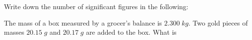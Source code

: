 \documentclass[10pt, a4paper]{exam}
\begin{document}
\begin{multicols*}{2}
\begin{questions}
        
        \question Write down the number of significant figures in the following:
    
        
        \question The mass of a box measured by a grocer's balance is $2.300 \; kg$. Two gold pieces of masses $20.15 \; g$ and $20.17 \; g$ are added to the box. What is 
        
        

\end{questions}
\end{multicols*}
\end{document}
